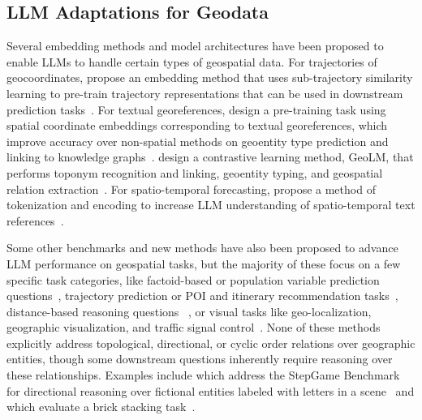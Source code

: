 \subsection{LLM Adaptations for Geodata}
Several embedding methods and model architectures have been proposed to enable LLMs to handle certain types of geospatial data.
For trajectories of geocoordinates, \citeauthor{Hu2023} propose an embedding method that uses sub-trajectory similarity learning to pre-train trajectory representations that can be used in downstream prediction tasks~\cite{Hu2023}.
For textual georeferences, \citeauthor{Li2021} design a pre-training task using spatial coordinate embeddings %
corresponding to textual georeferences, which improve
accuracy over non-spatial methods on geoentity type prediction and linking to knowledge graphs~\cite{Li2021}.
\citeauthor{Li2023b} design a contrastive learning method, GeoLM, that performs toponym recognition and linking, geoentity typing, and geospatial relation extraction~\cite{Li2023b}.
For spatio-temporal forecasting, \citeauthor{Liu2024large} propose a method of tokenization and encoding to increase LLM understanding of spatio-temporal text references~\cite{Liu2024large}.

Some other benchmarks and new methods have also been proposed to advance LLM performance on geospatial tasks, but the majority of these focus on a few specific task categories, like
factoid-based or population variable prediction questions~\cite{Qi2023,Roberts2023,Gupta2024,Yan2024,Manvi2024,Lietard2021}, 
trajectory prediction or POI and itinerary recommendation tasks~\cite{Schneider2025,Yu2025,Roberts2023,Xie2024,Gundawar2024,De2024,Sharma2023}, 
distance-based reasoning questions~\cite{Bhandari2023,Osullivan2024} , 
or visual tasks like geo-localization, geographic visualization, and traffic signal control~\cite{Feng2024b,Chen2024}.
None of these methods explicitly address topological, directional, or cyclic order relations over geographic entities, though some downstream questions inherently require reasoning over these relationships.
Examples include \citeauthor{Li2024} which address the StepGame Benchmark for directional reasoning over fictional entities labeled with letters in a scene~\cite{Li2024} and \citeauthor{Majic2024} which evaluate a brick stacking task~\cite{Majic2024}.


